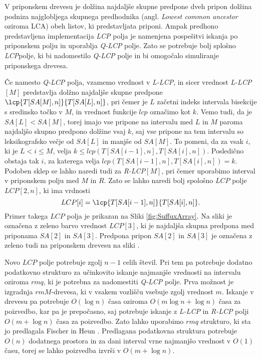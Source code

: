V priponskem drevesu je dolžina najdaljše skupne predpone dveh pripon dolžina podniza najglobljega skupnega predhodnika (angl. \textit{Lowest common ancestor} oziroma LCA) obeh listov, ki predstavljata priponi. Ampak predhono predstavljena implementacija \textit{LCP} polja je namenjena pospešitvi iskanja po priponskem polju in uporablja \textit{Q-LCP} polje. Zato se potrebuje bolj splošno \textit{LCP}polje, ki bi nadomestilo \textit{Q-LCP} polje in bi omogočalo simuliranje priponskega drevesa.

Če namesto \textit{Q-LCP} polja, vzamemo vrednost v \textit{L-LCP}, in sicer vrednost \textit{L-LCP}$[M]$ predstavlja dolžno najdaljše skupne predpone $\lcp{T[SA[M], n]}{T[SA[L], n]}$, pri čemer je $L$ začetni indeks intervala bisekcije s sredinsko točko v $M$, in vrednost funkcije $lcp$ označimo kot $k$. Vemo tudi, da je $SA[L]<SA[M]$, torej imajo vse pripone na intervalu med $L$ in $M$ paroma najdaljšo skupno predpono dolžine vsaj $k$, saj vse pripone na tem intervalu so leksikografsko večje od $SA[L]$ in manjše od $SA[M]$. To pomeni, da za vsak $i$, ki je $L<i\le M$, velja $k\le lcp(T[SA[i-1], n], T[SA[i], n])$. Posledično obstaja tak $i$, za katerega velja $lcp(T[SA[i-1], n], T[SA[i], n])=k$. Podoben sklep se lahko naredi tudi za \textit{R-LCP}$[M]$, pri čemer uporabimo interval v priponskem polju med $M$ in $R$. Zato se lahko naredi bolj spološno $LCP$ polje $LCP[2,n]$, ki ima vrdnosti 
$$
    LCP[i]=\lcp{T[SA[i-1], n]}{T[SA[i], n]}.
$$
Primer takega $LCP$ polja je prikazan na Sliki \ref{fig:SuffuxArray}. Na sliki je označena z zeleno barvo vrednost $LCP[3]$, ki je najdaljša skupna predpona med priponama $SA[2]$ in $SA[3]$. Predpona pripon  $SA[2]$ in $SA[3]$ je označena z zeleno tudi na priponskem drevesu na sliki \cite{Abouelhoda2004, Kasai2001}.

Novo $LCP$ polje potrebuje zgolj $n-1$ celih števil. Pri tem pa potrebuje dodatno podatkovno strukturo za učinkovito iskanje najmanjše vrednosti na intervalu oziroma $rmq$, ki je potrebna za nadomestiti \textit{Q-LCP} polje. Prva možnost je izgradnja $rmM$-drevesa, ki v vsakem vozlišču vsebuje zgolj vrednost $m$. Iskanje v drevesu pa potrebuje $O(\log{n})$ časa oziroma $O(m\log{n}+\log{n})$ časa za poizvedbo, kar pa je prepočasno, saj potrebuje iskanje z \textit{L-LCP} in \textit{R-LCP} polji $O(m+\log{n})$ časa za poizvedbo. Zato lahko uporabimo $rmq$ strukturo, ki sta jo predlagala Fischer in Heun \cite{Fischer2007}. Predlagana podatkovna struktura potrebuje $O(n)$ dodatnega prostora in za dani interval vrne najmanjšo vrednost v $O(1)$ času, torej se lahko poizvedba izvrši v $O(m+\log{n})$.

